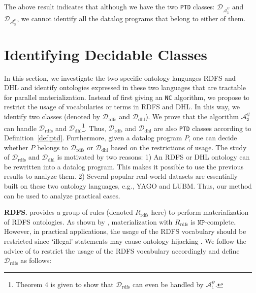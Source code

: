 \documentclass{article}
\begin{document}
The above result indicates that although we have the two \texttt{PTD} classes: $\mathcal{D}_{\mathcal{A}_1^{\psi}}$ and $\mathcal{D}_{\mathcal{A}_3^{\psi}}$, we cannot identify all the datalog
programs that belong to either of them.


\section{Identifying Decidable Classes}

In this section, we investigate the two specific ontology languages RDFS and DHL and identify ontologies expressed in these two languages that are tractable for parallel materialization. Instead
of first giving an \texttt{NC} algorithm, we propose to restrict the usage of vocabularies or terms in RDFS and DHL. In this way, we identify two classes (denoted by $\mathcal{D}_{\text{rdfs}}$ and $\mathcal{D}_{\text{dhl}}$). We prove that the algorithm $\mathcal{A}_3^{\psi}$ can handle $\mathcal{D}_{\text{rdfs}}$ and $\mathcal{D}_{\text{dhl}}$\footnote{Theorem 4 is given to show that $\mathcal{D}_{\text{rdfs}}$ can even be handled by $\mathcal{A}_1^{\psi}$.}. Thus, $\mathcal{D}_{\text{rdfs}}$ and $\mathcal{D}_{\text{dhl}}$ are also \texttt{PTD} classes according to Definition~\ref{def:ptd}. Furthermore, given a
datalog program $P$, one can decide whether $P$ belongs to $\mathcal{D}_{\text{rdfs}}$ or $\mathcal{D}_{\text{dhl}}$ based on
the restrictions of usage. The study of $\mathcal{D}_{\text{rdfs}}$ and $\mathcal{D}_{\text{dhl}}$ is motivated by two reasons: 1) An RDFS or DHL ontology can be rewritten into a datalog program. This makes it possible to use the previous results to analyze them. 2) Several popular real-world datasets are essentially
built on these two ontology languages, e.g., YAGO and LUBM. Thus, our method can be used to analyze practical cases.

\textbf{RDFS}. \citeauthor{rdfSemantic}  provides
a group of rules (denoted $R_{\text{rdfs}}$ here) to perform materialization of RDFS ontologies.
As shown by \citeauthor{DBLP:journals/ws/Horst05} , materialization with $R_{\text{rdfs}}$ is $\texttt{NP}$-complete. However, in practical applications, the usage of the RDFS vocabulary should be restricted since `illegal' statements may cause ontology
hijacking \cite{DBLP:journals/ijswis/HoganHP09}. We follow the advice of  \citeauthor{DBLP:journals/ijswis/HoganHP09} to restrict the usage of the RDFS vocabulary accordingly and
define $\mathcal{D}_{\text{rdfs}}$ as follows:
\end{document}
